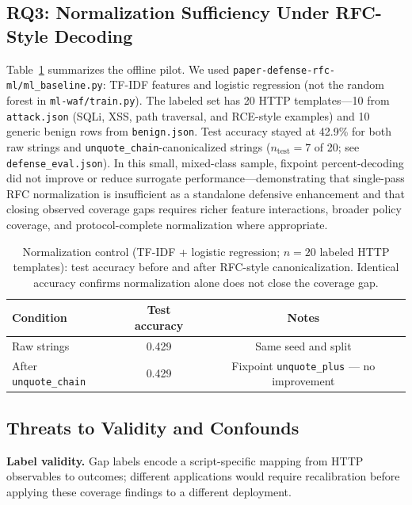 \subsection{RQ3: Normalization Sufficiency Under RFC-Style Decoding}
Table~\ref{tab:bypass_rates} summarizes the offline pilot. We used \texttt{paper-defense-rfc-ml/ml\_baseline.py}: TF-IDF features and logistic regression (not the random forest in \texttt{ml-waf/train.py}). The labeled set has 20 HTTP templates---10 from \texttt{attack.json} (SQLi, XSS, path traversal, and RCE-style examples) and 10 generic benign rows from \texttt{benign.json}. Test accuracy stayed at 42.9\% for both raw strings and \texttt{unquote\_chain}-canonicalized strings ($n_{\mathrm{test}}{=}7$ of 20; see \texttt{defense\_eval.json}). In this small, mixed-class sample, fixpoint percent-decoding did not improve or reduce surrogate performance---demonstrating that single-pass RFC normalization is insufficient as a standalone defensive enhancement and that closing observed coverage gaps requires richer feature interactions, broader policy coverage, and protocol-complete normalization where appropriate.

\begin{table}[t]
  \centering
  \caption{Normalization control (TF-IDF + logistic regression; $n{=}20$ labeled HTTP templates): test accuracy before and after RFC-style canonicalization. Identical accuracy confirms normalization alone does not close the coverage gap.}
  \label{tab:bypass_rates}
  \begin{tabular}{lcc}
    \toprule
    Condition & Test accuracy & Notes \\
    \midrule
    Raw strings & 0.429 & Same seed and split \\
    After \texttt{unquote\_chain} & 0.429 & Fixpoint \texttt{unquote\_plus} --- no improvement \\
    \bottomrule
  \end{tabular}
\end{table}

\subsection{Threats to Validity and Confounds}
\textbf{Label validity.} Gap labels encode a script-specific mapping from HTTP observables to outcomes; different applications would require recalibration before applying these coverage findings to a different deployment.

